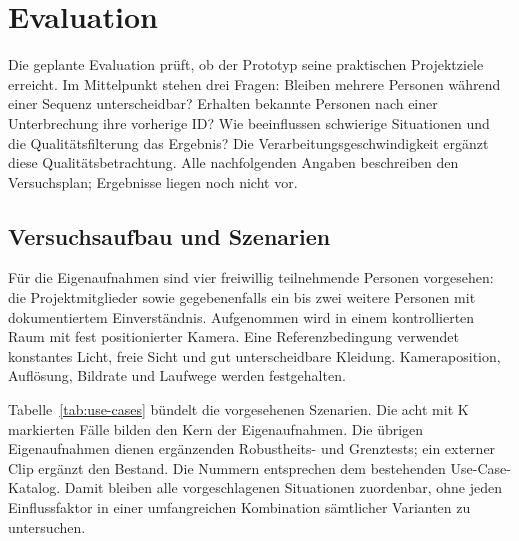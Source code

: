\documentclass[runningheads]{llncs}
\begin{document}
\section{Evaluation}
\label{sec:evaluation}

Die geplante Evaluation prüft, ob der Prototyp seine praktischen Projektziele erreicht. Im Mittelpunkt stehen drei Fragen: Bleiben mehrere Personen während einer Sequenz unterscheidbar? Erhalten bekannte Personen nach einer Unterbrechung ihre vorherige ID? Wie beeinflussen schwierige Situationen und die Qualitätsfilterung das Ergebnis? Die Verarbeitungsgeschwindigkeit ergänzt diese Qualitätsbetrachtung. Alle nachfolgenden Angaben beschreiben den Versuchsplan; Ergebnisse liegen noch nicht vor.

\subsection{Versuchsaufbau und Szenarien}

Für die Eigenaufnahmen sind vier freiwillig teilnehmende Personen vorgesehen: die Projektmitglieder sowie gegebenenfalls ein bis zwei weitere Personen mit dokumentiertem Einverständnis. Aufgenommen wird in einem kontrollierten Raum mit fest positionierter Kamera. Eine Referenzbedingung verwendet konstantes Licht, freie Sicht und gut unterscheidbare Kleidung. Kameraposition, Auflösung, Bildrate und Laufwege werden festgehalten.

Tabelle~\ref{tab:use-cases} bündelt die vorgesehenen Szenarien. Die acht mit K markierten Fälle bilden den Kern der Eigenaufnahmen. Die übrigen Eigenaufnahmen dienen ergänzenden Robustheits- und Grenztests; ein externer Clip ergänzt den Bestand. Die Nummern entsprechen dem bestehenden Use-Case-Katalog. Damit bleiben alle vorgeschlagenen Situationen zuordenbar, ohne jeden Einflussfaktor in einer umfangreichen Kombination sämtlicher Varianten zu untersuchen.
\end{document}
